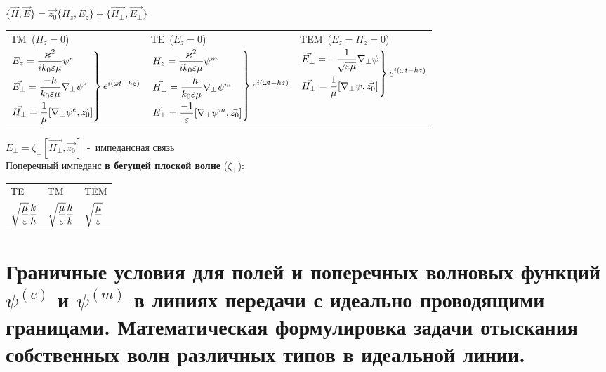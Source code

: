 \begin{multicols*}{2}
		$\{\vec{H},\vec{E}\}=\vec{z_0}\{{H_z},{E_z}\}+\{\vec{H_\perp},\vec{E_\perp}\}$ \\
		\begin{tabular}{l l l}
			TM~($H_z=0$) & TE~($E_z=0$) & TEM~($E_z=H_z=0$) \\
			$\begin{rcases}
				E_z=\dfrac{\varkappa^2}{ik_0\varepsilon\mu}\psi^e \\
				\vec{E_\perp} = \dfrac{-h}{k_0\varepsilon\mu}\nabla_\perp\psi^e \\
				\vec{H_\perp}=\dfrac1{\mu}[\nabla_\perp\psi^e,\vec{z_0}]
			\end{rcases} e^{i(\omega t-hz)}$ & 
			$\begin{rcases}
				H_z=\dfrac{\varkappa^2}{ik_0\varepsilon\mu}\psi^m \\
				\vec{H_\perp} = \dfrac{-h}{k_0\varepsilon\mu}\nabla_\perp\psi^m \\
				\vec{E_\perp}=\dfrac{-1}{\varepsilon}[\nabla_\perp\psi^m,\vec{z_0}]
			\end{rcases} e^{i(\omega t-hz)}$ & 
			$\begin{rcases}
				\vec{E_\perp} =-\dfrac1{\sqrt{\varepsilon\mu}}\nabla_\perp\psi \\
				\vec{H_\perp}=\dfrac1{\mu}[\nabla_\perp\psi,\vec{z_0}]
			\end{rcases} e^{i(\omega t-hz)}$ \\
		\end{tabular}
		$E_\perp=\zeta_\perp[\vec{H_\perp},\vec{z_0}]$~-~импедансная связь \\
		Поперечный импеданс \textbf{в бегущей плоской волне} ($\zeta_\perp$): \\
		\begin{tabular}{l l l}
			TE & TM & TEM \\
			$\sqrt{\dfrac{\mu}{\varepsilon}}\dfrac kh$ & $\sqrt{\dfrac{\mu}{\varepsilon}}\dfrac hk$ & $\sqrt{\dfrac{\mu}{\varepsilon}}$ \\
		\end{tabular}
		
		\section{Граничные условия для полей и поперечных волновых функций $\psi^{(e)}$ и $\psi^{(m)}$ в линиях передачи с идеально проводящими границами. Математическая формулировка задачи отыскания собственных волн различных типов в идеальной линии.}
		

\end{multicols*}
